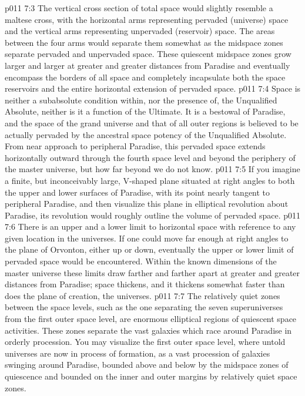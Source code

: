 \vs p011 7:3 The vertical cross section of total space would slightly resemble a maltese cross, with the horizontal arms representing pervaded (universe) space and the vertical arms representing unpervaded (reservoir) space. The areas between the four arms would separate them somewhat as the midspace zones separate pervaded and unpervaded space. These quiescent midspace zones grow larger and larger at greater and greater distances from Paradise and eventually encompass the borders of all space and completely incapsulate both the space reservoirs and the entire horizontal extension of pervaded space.
\pc \vs p011 7:4 Space is neither a subabsolute condition within, nor the presence of, the Unqualified Absolute, neither is it a function of the Ultimate. It is a bestowal of Paradise, and the space of the grand universe and that of all outer regions is believed to be actually pervaded by the ancestral space potency of the Unqualified Absolute. From near approach to peripheral Paradise, this pervaded space extends horizontally outward through the fourth space level and beyond the periphery of the master universe, but how far beyond we do not know.
\vs p011 7:5 If you imagine a finite, but inconceivably large, V\hyp{}shaped plane situated at right angles to both the upper and lower surfaces of Paradise, with its point nearly tangent to peripheral Paradise, and then visualize this plane in elliptical revolution about Paradise, its revolution would roughly outline the volume of pervaded space.
\vs p011 7:6 There is an upper and a lower limit to horizontal space with reference to any given location in the universes. If one could move far enough at right angles to the plane of Orvonton, either up or down, eventually the upper or lower limit of pervaded space would be encountered. Within the known dimensions of the master universe these limits draw farther and farther apart at greater and greater distances from Paradise; space thickens, and it thickens somewhat faster than does the plane of creation, the universes.
\pc \vs p011 7:7 The relatively quiet zones between the space levels, such as the one separating the seven superuniverses from the first outer space level, are enormous elliptical regions of quiescent space activities. These zones separate the vast galaxies which race around Paradise in orderly procession. You may visualize the first outer space level, where untold universes are now in process of formation, as a vast procession of galaxies swinging around Paradise, bounded above and below by the midspace zones of quiescence and bounded on the inner and outer margins by relatively quiet space zones.
